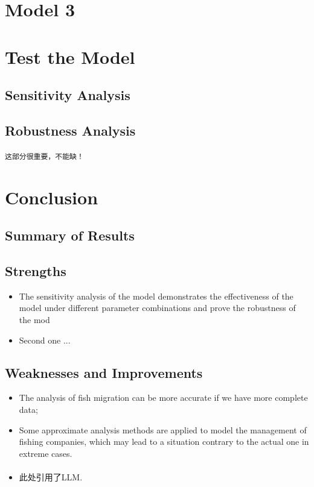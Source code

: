 \documentclass[12pt]{ctexart}
\newcommand{\upcite}[1]{\textsuperscript{\textsuperscript{\cite{#1}}}}%
\begin{document}
\section{Model 3}
\section{Test the Model}
\subsection{Sensitivity  Analysis}
\subsection{Robustness Analysis}
\texttt{这部分很重要，不能缺！}








\section{Conclusion}
\subsection{Summary of Results}

\subsection{Strengths}%
\begin{itemize}
	\item The sensitivity analysis of the model demonstrates the effectiveness of the model under different parameter combinations and prove the robustness of the mod
	\item Second one ...
\end{itemize}

\subsection{Weaknesses and Improvements}%
\begin{itemize}
	\item The analysis of fish migration can be more accurate if we have more complete data;
	\item Some approximate analysis methods are applied to model the management of fishing
	      companies, which may lead to a situation contrary to the actual one  in extreme cases.
	\item 此处引用了LLM.\upcite{openai2024chatgpt}
\end{itemize}
\end{document}
